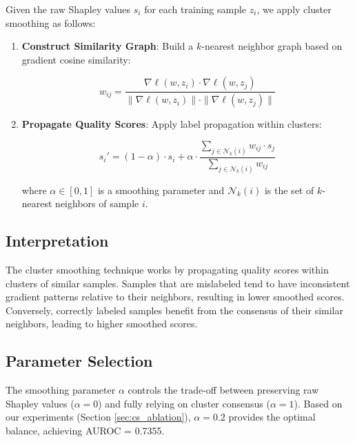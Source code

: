 \documentclass[12pt,a4paper]{report}
\begin{document}
Given the raw Shapley values $s_i$ for each training sample $z_i$, we apply cluster smoothing as follows:

\begin{enumerate}
    \item \textbf{Construct Similarity Graph}: Build a $k$-nearest neighbor graph based on gradient cosine similarity:
    
    \begin{equation}
        w_{ij} = \frac{\nabla\ell(w, z_i) \cdot \nabla\ell(w, z_j)}{\|\nabla\ell(w, z_i)\| \cdot \|\nabla\ell(w, z_j)\|}
        \label{eq:cosine_similarity}
    \end{equation}
    
    \item \textbf{Propagate Quality Scores}: Apply label propagation within clusters:
    
    \begin{equation}
        s_i' = (1 - \alpha) \cdot s_i + \alpha \cdot \frac{\sum_{j \in \mathcal{N}_k(i)} w_{ij} \cdot s_j}{\sum_{j \in \mathcal{N}_k(i)} w_{ij}}
        \label{eq:cluster_smoothing}
    \end{equation}
    
    where $\alpha \in [0, 1]$ is a smoothing parameter and $\mathcal{N}_k(i)$ is the set of $k$-nearest neighbors of sample $i$.
\end{enumerate}

\subsection{Interpretation}
\label{sec:cs_interpretation}

The cluster smoothing technique works by propagating quality scores within clusters of similar samples. Samples that are mislabeled tend to have inconsistent gradient patterns relative to their neighbors, resulting in lower smoothed scores. Conversely, correctly labeled samples benefit from the consensus of their similar neighbors, leading to higher smoothed scores.

\subsection{Parameter Selection}
\label{sec:cs_params}

The smoothing parameter $\alpha$ controls the trade-off between preserving raw Shapley values ($\alpha = 0$) and fully relying on cluster consensus ($\alpha = 1$). Based on our experiments (Section \ref{sec:cs_ablation}), $\alpha = 0.2$ provides the optimal balance, achieving AUROC = 0.7355.
\end{document}
